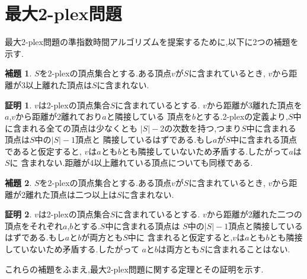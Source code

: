 \documentclass{thesis}
\theoremstyle{definition}
\newtheorem{lemma}{補題}[chapter]
\newtheorem*{prf*}{証明}
\begin{document}
\section{最大2-plex問題}
最大2-plex問題の準指数時間アルゴリズムを提案するために,以下に2つの補題を示す.
\begin{lemma} \label{lemma:1}
$S$を2-plexの頂点集合とする.ある頂点$v$が$S$に含まれているとき,
$v$から距離が3以上離れた頂点は$S$に含まれない.
\begin{prf*}
$v$は2-plexの頂点集合$S$に含まれているとする.
$v$から距離が3離れた頂点を$a$,$v$から距離が2離れており$a$と隣接している
頂点を$b$とする.2-plexの定義より,$S$中に含まれる全ての頂点は少なくとも
$|S| - 2$の次数を持つ,つまり$S$中に含まれる頂点は$S$中の$|S| - 1$頂点と
隣接しているはずである.もし$a$が$S$中に含まれる頂点であると仮定すると,
$v$は$a$とも$b$とも隣接していないため矛盾する.したがって$a$は$S$に
含まれない.距離が4以上離れている頂点についても同様である.
\end{prf*}
\end{lemma}
\begin{lemma} \label{lemma:2}
$S$を2-plexの頂点集合とする.ある頂点$v$が$S$に含まれているとき,
$v$から距離が2離れた頂点は二つ以上は$S$に含まれない.
\begin{prf*}
$v$は2-plexの頂点集合$S$に含まれているとする.
$v$から距離が2離れた二つの頂点をそれぞれ$a$,$b$とする.$S$中に含まれる頂点は
$S$中の$|S| - 1$頂点と隣接しているはずである.もし$a$と$b$が両方とも$S$中に
含まれると仮定すると,$v$は$a$とも$b$とも隣接していないため矛盾する.したがって
$a$と$b$は両方とも$S$に含まれることはない.
\end{prf*}
\end{lemma}
これらの補題をふまえ,最大2-plex問題に関する定理とその証明を示す.
\end{document}
